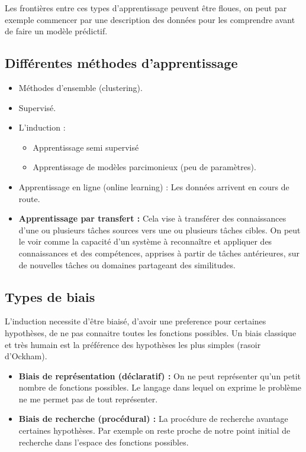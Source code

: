 \documentclass{article}
\begin{document}
Les frontières entre ces types d'apprentissage peuvent être floues, on peut par exemple commencer par une description des données pour les comprendre avant de faire un modèle prédictif.

\subsection{Différentes méthodes d'apprentissage}

\begin{itemize}

\item Méthodes d'ensemble (clustering).

\item Supervisé.

\item L'induction :
    \begin{itemize}
    \item Apprentissage semi supervisé 
    \item Apprentissage de modèles parcimonieux (peu de paramètres).
    \end{itemize}

\item Apprentissage en ligne (online learning) : Les données arrivent en cours de route.

\item \textbf{Apprentissage par transfert :} Cela vise à transférer des connaissances d'une ou plusieurs tâches sources vers une ou plusieurs tâches cibles. On peut le voir comme la capacité d’un système à reconnaître et appliquer des connaissances et des compétences, apprises à partir de tâches antérieures, sur de nouvelles tâches ou domaines partageant des similitudes.

\end{itemize}

\subsection{Types de biais}

L'induction necessite d'être biaisé, d'avoir une preference pour certaines hypothèses, de ne pas connaitre toutes les fonctions possibles. Un biais classique et très humain est la préférence des hypothèses les plus simples (rasoir d'Ockham).

\begin{itemize}
\item \textbf{Biais de représentation (déclaratif) :} On ne peut représenter qu'un petit nombre de fonctions possibles. Le langage dans lequel on exprime le problème ne me permet pas de tout représenter.
\item \textbf{Biais de recherche (procédural) :} La procédure de recherche avantage certaines hypothèses. Par exemple on reste proche de notre point initial de recherche dans l'espace des fonctions possibles.
\end{itemize}
\end{document}
